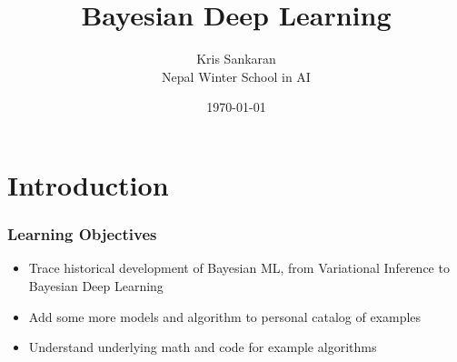 \documentclass[10pt,mathserif]{beamer}
\title{\large \bfseries Bayesian Deep Learning}
\author{Kris Sankaran\\[3ex]
Nepal Winter School in AI}
\date{\today}
\begin{document}
\maketitle

\section{Introduction}
\label{sec:introduction}

\begin{frame}
  \frametitle{Learning Objectives}
  \begin{itemize}
  \item Trace historical development of Bayesian ML, from Variational Inference
    to Bayesian Deep Learning
  \item Add some more models and algorithm to personal catalog of examples
  \item Understand underlying math and code for example algorithms
  \end{itemize}
\end{frame}
\end{document}
